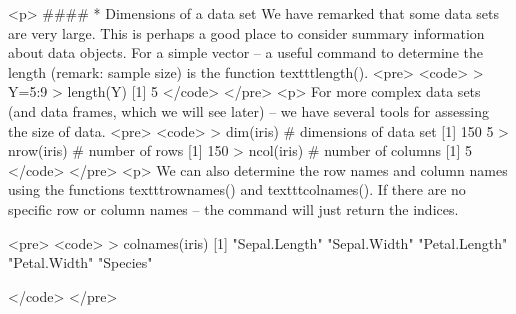 

<p>
####        * {Dimensions of a data set}
We have remarked that some data sets are very large. This is perhaps a good place to consider summary information about data objects.
For a simple vector – a useful command to determine the length (remark: sample size) is the function texttt{length()}.
<pre>
<code>
> Y=5:9
> length(Y)
[1] 5
</code>
</pre>
<p>
For more complex data sets (and data frames, which we will see later) – we have several tools for assessing the size of data.
<pre>
<code>
> dim(iris)  # dimensions of data set
[1] 150   5
> nrow(iris) # number of rows
[1] 150
> ncol(iris) # number of columns
[1] 5
</code>
</pre>
<p>
We can also determine the row names and column names using the functions texttt{rownames()} and texttt{colnames()}.
If there are no specific row or column names – the command will just return the indices.

<pre>
<code>
> colnames(iris)
[1] "Sepal.Length" "Sepal.Width"  "Petal.Length" "Petal.Width"  "Species"

</code>
</pre>
